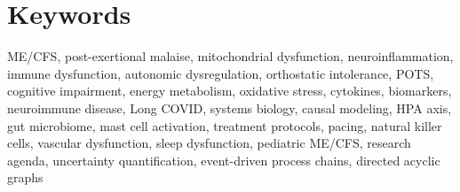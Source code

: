 \chapter*{Keywords}

\begin{keywords}
ME/CFS, post-exertional malaise, mitochondrial dysfunction, neuroinflammation, immune dysfunction, autonomic dysregulation, orthostatic intolerance, POTS, cognitive impairment, energy metabolism, oxidative stress, cytokines, biomarkers, neuroimmune disease, Long COVID, systems biology, causal modeling, HPA axis, gut microbiome, mast cell activation, treatment protocols, pacing, natural killer cells, vascular dysfunction, sleep dysfunction, pediatric ME/CFS, research agenda, uncertainty quantification, event-driven process chains, directed acyclic graphs
\end{keywords}

